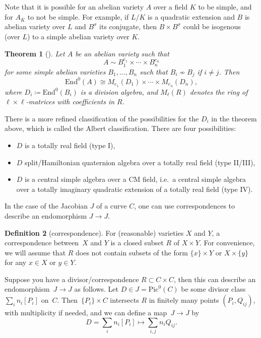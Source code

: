 \documentclass[12pt]{article}
\newtheorem{theorem}{Theorem}[section]
\theoremstyle{definition}
\newtheorem{definition}[theorem]{Definition}
\numberwithin{equation}{subsection}
\begin{document}
Note that it is possible for an abelian variety $A$ over a field $K$ to be simple, and for $A_{\overline{K}}$ to not be simple. For example, if $L/K$ is a quadratic extension and $B$ is abelian variety over $L$ and $B^\sigma$ its conjugate, then $B \times B^\sigma$ could be isogenous (over $L$) to a simple abelian variety over $K$.

\begin{theorem}[\textrm{\cite[Corollary~12.7]{AbVarBook}}]
Let $A$ be an abelian variety such that
$$A \sim B_1^{e_1} \times \cdots \times B_n^{e_n}$$
for some simple abelian varieties $B_1, \ldots, B_n$ such that $B_i \not\sim B_j$ if $i \neq j$. Then
$$\mathrm{End}^0(A) \cong M_{e_1}(D_1) \times \cdots \times M_{e_n}(D_n),$$
where $D_i \coloneqq \mathrm{End}^0(B_i)$ is a division algebra, and $M_{\ell}(R)$ denotes the ring of $\ell \times \ell$-matrices with coefficients in $R$.
\end{theorem}

There is a more refined classification of the possibilities for the $D_i$ in the theorem above, which is called the Albert classification.
There are four possibilities:\\[-1.0cm]
\begin{itemize}\itemsep0pt
\item $D$ is a totally real field (type I),
\item $D$ split/Hamiltonian quaternion algebra over a totally real field (type II/III), 
\item $D$ is a central simple algebra over a CM field, i.e.\ a central simple algebra over a totally imaginary quadratic extension of a totally real field (type IV).
\end{itemize}

In the case of the Jacobian $J$ of a curve $C$, one can use correspondences to describe an endomorphism $J \to J$.

\begin{definition}[correspondence]
For (reasonable) varieties $X$ and $Y$, a correspondence between~$X$ and $Y$ is a closed subset $R$ of $X \times Y$. For convenience, we will assume that $R$ does not contain subsets of the form $\{x\} \times Y$ or $X \times \{y\}$ for any $x \in X$ or $y \in Y$.
\end{definition}

Suppose you have a divisor/correspondence $R \subset C \times C$, then this can describe an endomorphism~$J \to J$ as follows.
Let $D \in J = \mathrm{Pic}^0(C)$ be some divisor class $\sum_i n_i[P_i]$ on~$C$.
Then~$\{P_i\} \times C$ intersects $R$ in finitely many points $(P_i, Q_{ij})$, with multiplicity if needed, and we can define a map~$J \to J$ by
$$D = \sum_i n_i[P_i] \mapsto \sum_{i,j} n_i Q_{ij}.$$
\end{document}
